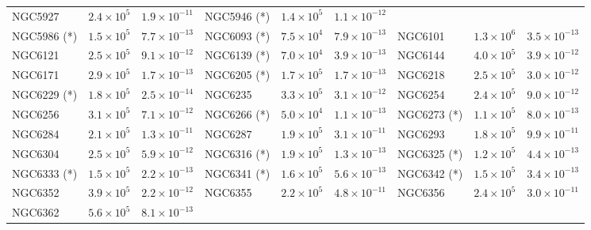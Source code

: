\begin{table}
\begin{center}
\begin{tabular}{l | c | c | l |  c|   c | l | c | c }
            NGC5927 &  $2.4\times10^5$ &          $1.9\times10^{-11}$  &
            NGC5946 (*) &  $1.4\times10^5$ &          $1.1\times10^{-12}$  \\
            NGC5986 (*) &  $1.5\times10^5$ &          $7.7\times10^{-13}$  &
            NGC6093 (*) &  $7.5\times10^4$ &          $7.9\times10^{-13}$  &
            NGC6101 &  $1.3\times10^6$ &          $3.5\times10^{-13}$  \\
            NGC6121 &  $2.5\times10^5$ &          $9.1\times10^{-12}$  &
            NGC6139 (*) &  $7.0\times10^4$ &          $3.9\times10^{-13}$  &
            NGC6144 &  $4.0\times10^5$ &          $3.9\times10^{-12}$  \\
            NGC6171 &  $2.9\times10^5$ &          $1.7\times10^{-13}$  &
            NGC6205 (*) &  $1.7\times10^5$ &          $1.7\times10^{-13}$  &
            NGC6218 &  $2.5\times10^5$ &          $3.0\times10^{-12}$  \\
            NGC6229 (*) &  $1.8\times10^5$ &          $2.5\times10^{-14}$ &
            NGC6235 &  $3.3\times10^5$ &          $3.1\times10^{-12}$  &
            NGC6254 &  $2.4\times10^5$ &          $9.0\times10^{-12}$ \\
            NGC6256 &  $3.1\times10^5$ &          $7.1\times10^{-12}$  &
            NGC6266 (*)&  $5.0\times10^4$ &          $1.1\times10^{-13}$  &
            NGC6273 (*) &  $1.1\times10^5$ &          $8.0\times10^{-13}$  \\
            NGC6284 &  $2.1\times10^5$ &          $1.3\times10^{-11}$  &
            NGC6287 &  $1.9\times10^5$ &          $3.1\times10^{-11}$  &
            NGC6293 &  $1.8\times10^5$ &          $9.9\times10^{-11}$ \\
            NGC6304 &  $2.5\times10^5$ &          $5.9\times10^{-12}$  &
            NGC6316 (*) &  $1.9\times10^5$ &          $1.3\times10^{-13}$  &
            NGC6325 (*) &  $1.2\times10^5$ &          $4.4\times10^{-13}$  \\
            NGC6333 (*) &   $1.5\times10^5$ &          $2.2\times10^{-13}$ &
            NGC6341 (*) &  $1.6\times10^5$ &          $5.6\times10^{-13}$  &
            NGC6342 (*) &  $1.5\times10^5$ &          $3.4\times10^{-13}$  \\
            NGC6352 &  $3.9\times10^5$ &          $2.2\times10^{-12}$  &
            NGC6355 &   $2.2\times10^5 $ &          $4.8\times10^{-11}$  &
            NGC6356 &  $2.4\times10^5$ &          $3.0\times10^{-11}$  \\
            NGC6362 &  $5.6\times10^5$ &          $8.1\times10^{-13}$  &

\end{tabular}
\end{center}
\end{table}
